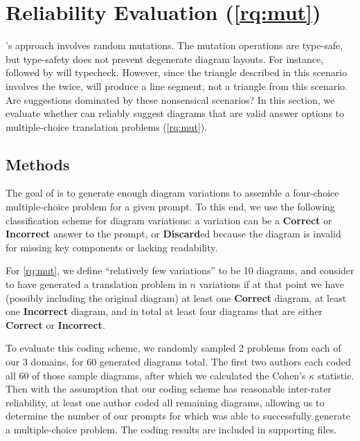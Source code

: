 \section{Reliability Evaluation (\ref{rq:mut})}
\label{sec:reliability-eval}

\Edgeworth's approach involves random mutations. The mutation operations are type-safe, but type-safety does not prevent degenerate diagram layouts. For instance,  followed by  will typecheck. However, since the triangle described in this scenario involves the  twice, \Edgeworth will produce a line segment, not a triangle from this scenario. Are \Edgeworth suggestions dominated by these nonsensical scenarios? In this section, we evaluate whether \Edgeworth can reliably suggest diagrams that are valid answer options to multiple-choice translation problems (\ref{rq:mut}). 

\subsection{Methods}
\label{sec:reliability-method}

The goal of \Edgeworth is to generate enough diagram variations to assemble a four-choice multiple-choice problem for a given prompt. To this end, we use the following classification scheme for diagram variations: a variation can be a \textbf{Correct} or \textbf{Incorrect} answer to the prompt, or \textbf{Discard}ed because the diagram is invalid for missing key components or lacking readability.

For \ref{rq:mut}, we define ``relatively few variations'' to be 10 diagrams, and consider \Edgeworth to have generated a translation problem in $n$ variations if at that point we have (possibly including the original diagram) at least one \textbf{Correct} diagram, at least one \textbf{Incorrect} diagram, and in total at least four diagrams that are either \textbf{Correct} or \textbf{Incorrect}.

To evaluate this coding scheme, we randomly sampled 2 problems from each of our 3 domains, for 60 generated diagrams total. The first two authors each coded all 60 of those sample diagrams, after which we calculated the Cohen's $\kappa$ \cite{cohen1960coefficient} statistic. Then with the assumption that our coding scheme has reasonable inter-rater reliability, at least one author coded all remaining diagrams, allowing us to determine the number of our prompts for which \Edgeworth was able to successfully generate a multiple-choice problem. The coding results are included in supporting files.

